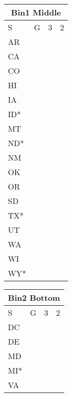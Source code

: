 \documentclass{article}
\begin{document}
\begin{tabular}[t]{ll|l|l}
\multicolumn{4}{c}{\textbf{Bin1 Middle}} \\
\toprule
S                    & G                & 3                & 2                \\ \midrule
AR                   & \cellcolor{blue} & \cellcolor{blue} & \cellcolor{red}  \\
CA                   & \cellcolor{blue} & \cellcolor{red}  & \cellcolor{red}  \\
CO                   & \cellcolor{blue} & \cellcolor{blue} & \cellcolor{red}  \\
HI                   & \cellcolor{blue} & \cellcolor{red}  & \cellcolor{red}  \\
IA                   & \cellcolor{blue} & \cellcolor{blue} & \cellcolor{blue} \\
ID*                  & \cellcolor{blue} & \cellcolor{red}  & \cellcolor{red}  \\
MT                   & \cellcolor{blue} & \cellcolor{blue} & \cellcolor{red}  \\
ND*                  & \cellcolor{blue} & \cellcolor{blue} & \cellcolor{blue} \\
NM                   & \cellcolor{blue} & \cellcolor{blue} & \cellcolor{red}  \\
OK                   & \cellcolor{blue} & \cellcolor{blue} & \cellcolor{red}  \\
OR                   & \cellcolor{blue} & \cellcolor{red}  & \cellcolor{red}  \\
SD                   & \cellcolor{blue} & \cellcolor{blue} & \cellcolor{blue} \\
TX*                  & \cellcolor{blue} & \cellcolor{blue} & \cellcolor{red}  \\
UT                   & \cellcolor{blue} & \cellcolor{red}  & \cellcolor{red}  \\
WA                   & \cellcolor{blue} & \cellcolor{red}  & \cellcolor{red}  \\
WI                   & \cellcolor{blue} & \cellcolor{blue} & \cellcolor{blue} \\
WY*                  & \cellcolor{blue} & \cellcolor{red}  & \cellcolor{red}  \\ \bottomrule
\end{tabular}
\hspace{1em}
\begin{tabular}[t]{ll|l|l}
\multicolumn{4}{c}{\textbf{Bin2 Bottom}} \\
\toprule
S   & G                  & 3                  & 2                  \\ \midrule
DC  & \cellcolor{yellow} & \cellcolor{yellow} & \cellcolor{red}    \\
DE  & \cellcolor{yellow} & \cellcolor{yellow} & \cellcolor{red}    \\
MD  & \cellcolor{yellow} & \cellcolor{yellow} & \cellcolor{red}    \\
MI* & \cellcolor{yellow} & \cellcolor{yellow} & \cellcolor{yellow} \\
VA  & \cellcolor{yellow} & \cellcolor{yellow} & \cellcolor{red}    \\ \bottomrule
\end{tabular}
\end{document}
